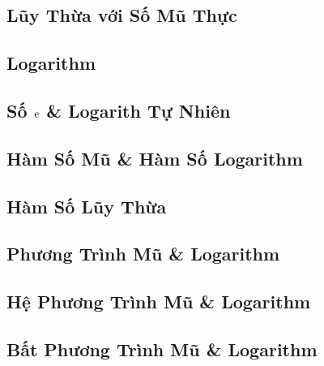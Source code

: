 \documentclass{article}
\numberwithin{equation}{section}
\begin{document}
\subsection{Lũy Thừa với Số Mũ Thực}


\subsection{Logarithm}


\subsection{Số $\rm e$ \& Logarith Tự Nhiên}


\subsection{Hàm Số Mũ \& Hàm Số Logarithm}


\subsection{Hàm Số Lũy Thừa}


\subsection{Phương Trình Mũ \& Logarithm}


\subsection{Hệ Phương Trình Mũ \& Logarithm}


\subsection{Bất Phương Trình Mũ \& Logarithm}
\end{document}
